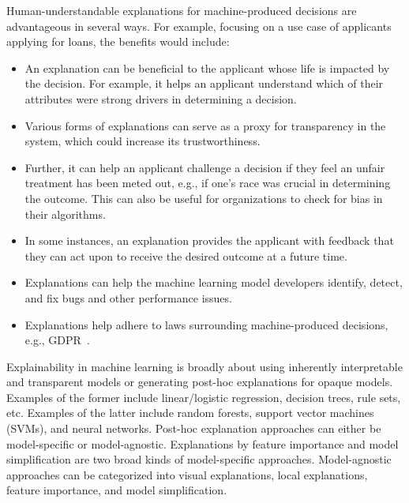 Human-understandable explanations for machine-produced decisions are advantageous in several ways. For example, focusing on a use case of applicants applying for loans, the benefits would include:   %
\begin{itemize}[leftmargin=10pt]
    \item An explanation can be beneficial to the applicant whose life is impacted by the decision. For example, it helps an applicant understand which of their attributes were strong drivers in determining a decision.
    \item Various forms of explanations can serve as a proxy for transparency in the system, which could increase its trustworthiness.
    \item Further, it can help an applicant challenge a decision if they feel an unfair treatment has been meted out, e.g., if one's race was crucial in determining the outcome. This can also be useful for organizations to check for bias in their algorithms.  
    \item In some instances, an explanation provides the applicant with feedback that they can act upon to receive the desired outcome at a future time.
    \item Explanations can help the machine learning model developers identify, detect, and fix bugs and other performance issues. 
    \item Explanations help adhere to laws surrounding machine-produced decisions, e.g., GDPR~\cite{GDPR}. 
\end{itemize}


Explainability in machine learning is broadly about using inherently interpretable and transparent models or generating post-hoc explanations for opaque models. 
Examples of the former include linear/logistic regression, decision trees, rule sets, etc. Examples of the latter include random forests, support vector machines (SVMs), and neural networks. Post-hoc explanation approaches can either be model-specific or model-agnostic. 
Explanations by feature importance and model simplification are two broad kinds of model-specific approaches. 
Model-agnostic approaches can be categorized into visual explanations, local explanations, feature importance, and model simplification. 

\vspace{5pt}

